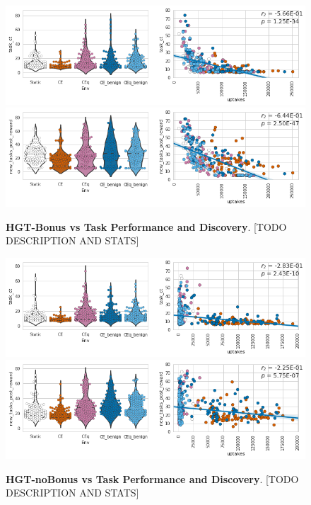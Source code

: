 \documentclass[PhD]{msu-thesis}
\begin{document}
	\begin{figure}[!h]
	\includegraphics[trim={0 0 0 0}, clip, width=0.75\columnwidth]{figures/LTE/lte-bonus_hgt_vs_task_performance.png}
	\includegraphics[trim={0 0 0 0}, clip, width=0.75\columnwidth]{figures/LTE/lte-bonus_hgt_vs_task_discovery.png}
	\caption{\textbf{HGT-Bonus vs Task Performance and Discovery}. [TODO DESCRIPTION AND STATS]%
	}
	\label{fig:lte-bonus_hgt_vs_task_performance}
	\end{figure}

	\begin{figure}[!h]
	\includegraphics[trim={0 0 0 0}, clip, width=0.75\columnwidth]{figures/LTE/lte-no-bonus_hgt_vs_task_performance.png}
	\includegraphics[trim={0 0 0 0}, clip, width=0.75\columnwidth]{figures/LTE/lte-no-bonus_hgt_vs_task_discovery.png}
	\caption{\textbf{HGT-noBonus vs Task Performance and Discovery}. [TODO DESCRIPTION AND STATS]%
	}
	\label{fig:lte-no-bonus_hgt_vs_task_performance}
	\end{figure}	
\end{document}
